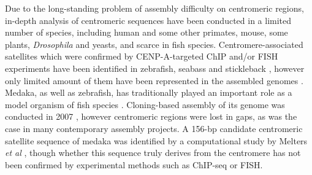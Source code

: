 Due to the long-standing problem of assembly difficulty on centromeric regions, in-depth analysis of centromeric sequences have been conducted in a limited number of species, including human and some other primates, mouse, some plants, \textit{Drosophila} and yeasts, and scarce in fish species. Centromere-associated satellites which were confirmed by CENP-A-targeted ChIP and/or FISH experiments have been identified in zebrafish, seabass and stickleback \cite{Phillips2000, Kuznestova2014, Check2015}, however only limited amount of them have been represented in the assembled genomes \cite{Howe2013, Vij2016, Ceck2015}. Medaka, as well as zebrafish, has traditionally played an important role as a model organism of fish species \cite{Wittbrodt2002}. Cloning-based assembly of its genome was conducted in 2007 \cite{Kasahara2007}, however centromeric regions were lost in gaps, as was the case in many contemporary assembly projects. A 156-bp candidate centromeric satellite sequence of medaka was identified by a computational study by Melters \textit{et al} \cite{Melters2013}, though whether this sequence truly derives from the centromere has not been confirmed by experimental methods such as ChIP-seq or FISH.
